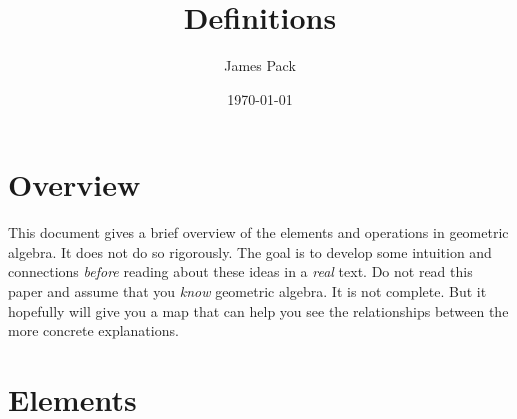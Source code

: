 \documentclass[8pt]{article}
\title{Definitions}
\author{James Pack}
\date{\today}
\begin{document}
\maketitle
\thispagestyle{fancy} %

\section{Overview}
This document gives a brief overview of the elements and operations in geometric algebra. It does not do so rigorously. The goal is to develop some intuition and connections \emph{before} reading about these ideas in a \emph{real} text. Do not read this paper and assume that you \emph{know} geometric algebra. It is not complete. But it hopefully will give you a map that can help you see the relationships between the more concrete explanations.

\section{Elements}
\end{document}
